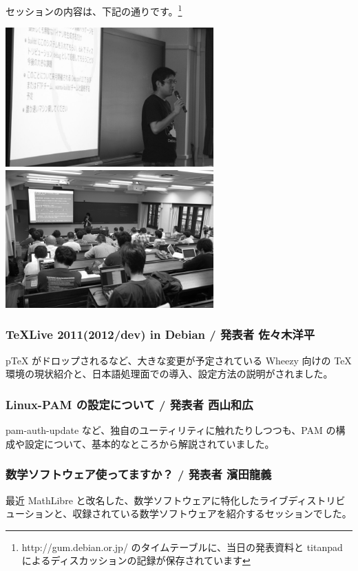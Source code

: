 \documentclass[mingoth,a4paper]{jsarticle}
\begin{document}
セッションの内容は、下記の通りです。\footnote{http://gum.debian.or.jp/ のタイムテーブルに、当日の発表資料と titanpad によるディスカッションの記録が保存されています}

\includegraphics[width=8cm]{image201206/gum2012-session2_mono.jpg}
\includegraphics[width=8cm]{image201206/gum2012-session1_mono.jpg}

\subsubsection{TeXLive 2011(2012/dev) in Debian / 発表者 佐々木洋平}

pTeX がドロップされるなど、大きな変更が予定されている Wheezy 向けの \TeX 環境の現状紹介と、日本語処理面での導入、設定方法の説明がされました。

\subsubsection{Linux-PAM の設定について / 発表者 西山和広}

pam-auth-update など、独自のユーティリティに触れたりしつつも、PAM の構成や設定について、基本的なところから解説されていました。

\subsubsection{数学ソフトウェア使ってますか？ / 発表者 濱田龍義}

最近 MathLibre と改名した、数学ソフトウェアに特化したライブディストリビューションと、収録されている数学ソフトウェアを紹介するセッションでした。
\end{document}

